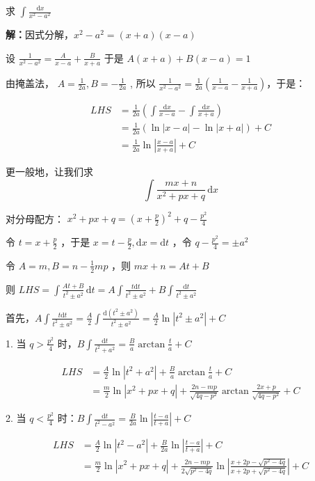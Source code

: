\begin{example}{}
求 $\displaystyle{\int \frac{\,\mathrm{d}x}{x^2-a^2}}$

\textbf{解：}因式分解，\(x^2-a^2=(x+a)(x-a)\)

设 $\displaystyle{\frac{1}{x^2-a^2}=\frac{A}{x-a}+\frac{B}{x+a}}$ 于是 \(A(x+a)+B(x-a)=1\)

由掩盖法， $\displaystyle{A=\frac{1}{2a},B=-\frac{1}{2a}}$ , 所以 $\displaystyle{\frac{1}{x^2-a^2}=\frac{1}{2a}\left(\frac{1}{x-a}-\frac{1}{x+a} \right)}$，于是：

\begin{equation}\begin{aligned}
LHS&=\frac{1}{2a}\left(\int\frac{\mathrm{d}x}{x-a}-\int\frac{\mathrm{d}x}{x+a}\right)\\&=\frac{1}{2a}\left(\ln|x-a|-\ln|x+a|\right)+C \\&=\frac{1}{2a}\ln\left|\frac{x-a}{x+a}\right|+C
\end{aligned}\end{equation}

更一般地，让我们求
$$\int\frac{mx+n}{x^2+px+q}\,\mathrm{d}x$$

对分母配方： $\displaystyle{x^2+px+q=\left(x+\frac{p}{2}\right)^2+q-\frac{p^2}{4}}$

令 $\displaystyle{t=x+\frac{p}{2}}$ ，于是 $\displaystyle{x=t-\frac{p}{2},\mathrm{d}x=\mathrm {d}t}$ ，令 $\displaystyle{q-\frac{p^2}{4}=\pm a^2}$

令 $\displaystyle{A=m,B=n-\frac{1}{2}mp}$ ，则 \(mx+n=At+B\)

则 $\displaystyle{LHS=\int\frac{At+B}{t^2\pm a^2}\,\mathrm{d}t =A\int\frac{t\mathrm{d}t}{t^2\pm a^2}+B\int\frac{\mathrm{d}t}{t^2\pm a^2}}$

首先，$\displaystyle{A\int\frac{t\mathrm{d}t}{t^2\pm a^2}=\frac{A}{2}\int\frac{\mathrm{d}\left(t^2\pm a^2\right)}{t^2\pm a^2}=\frac{A}{2}\ln\left|t^2\pm a^2\right|+C}$

1. 当 $\displaystyle{q>\frac{p^2}{4}}$ 时，$\displaystyle{B\int\frac{\mathrm{d}t}{t^2+ a^2}=\frac{B}{a}\arctan{\frac{t}{a}}+C}$

\begin{equation}\begin{aligned}
LHS&=\frac{A}{2}\ln\left|t^2+ a^2\right|+\frac{B}{a}\arctan{\frac{t}{a}}+C \\&=\frac{m}{2}\ln\left|x^2+px+q\right|+\frac{2n-mp}{\sqrt{4q-p^2}}\arctan{\frac{2x+p}{\sqrt{4q-p^2}}}+C
\end{aligned}\end{equation}

2. 当 $\displaystyle{q<\frac{p^2}{4}}$ 时：$\displaystyle{B\int\frac{\mathrm{d}t}{t^2- a^2}=\frac{B}{2a}\ln\left|\frac{t-a}{t+a}\right|+C}$ 

\begin{equation}\begin{aligned}
LHS&=\frac{A}{2}\ln\left|t^2- a^2\right|+\frac{B}{2a}\ln\left|\frac{t-a}{t+a}\right|+C \\&=\frac{m}{2}\ln\left|x^2+px+q\right|+\frac{2n-mp}{2\sqrt{p^2-4q}}\ln\left|\frac{x+2p-\sqrt{p^2-4q}}{x+2p+\sqrt{p^2-4q}}\right|+C
\end{aligned}\end{equation}
\end{example}
